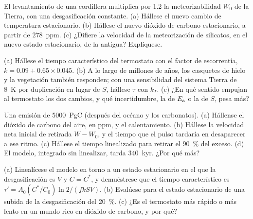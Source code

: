\begin{exercise}[$\star\star$]\label{exo:b2:deep-time-climate:9}
El levantamiento de una cordillera multiplica por 1.2 la meteorizabilidad $W_0$ de la Tierra, con una
desgasificación constante. (a) Hállese el nuevo cambio de temperatura estacionario. (b) Hállese el nuevo dióxido de carbono estacionario, a partir de
\qty{278}{ppm}. (c) ¿Difiere la velocidad de la meteorización de silicatos, en el nuevo estado estacionario, de la
antigua? Explíquese.
\end{exercise}

\begin{exercise}[$\star\star\star$]\label{exo:b2:deep-time-climate:10}
(a) Hállese el tiempo característico del termostato con el factor de escorrentía, $k = 0.09 + 0.65\times0.045$.
(b) A lo largo de millones de años, los casquetes de hielo y la vegetación también responden; con una sensibilidad del
sistema Tierra de \qty{8}{K} por duplicación en lugar de $S$, hállese $\tau$ con $k_T$. (c) ¿En qué sentido empujan
al termostato los dos cambios, y qué incertidumbre, la de $E_{\text a}$ o la de $S$, pesa más?
\end{exercise}

\begin{exercise}[$\star\star\star$]\label{exo:b2:deep-time-climate:11}
Una emisión de \qty{5000}{PgC} (después del océano y los carbonatos). (a) Hállense el dióxido de carbono del
aire, en ppm, y el calentamiento. (b) Hállese la velocidad neta inicial de retirada $W - W_0$, y el tiempo que el
pulso tardaría en desaparecer a ese ritmo. (c) Hállese el tiempo linealizado para retirar el \qty{90}{\percent}
del exceso. (d) El modelo, integrado sin linealizar, tarda \qty{340}{kyr}. ¿Por qué más?
\end{exercise}

\begin{exercise}[$\star\star\star$]\label{exo:b2:deep-time-climate:12}
(a) Linealícese el modelo en torno a un estado estacionario en el que la desgasificación es $V$ y $C = C^*$, y demuéstrese que
el tiempo característico es $\tau' = A_0 (C^*/C_0)\ln 2/(f k S V)$. (b) Evalúese para el estado estacionario
de una subida de la desgasificación del \qty{20}{\percent}. (c) ¿Es el termostato más rápido o más lento en un mundo rico en
dióxido de carbono, y por qué?
\end{exercise}

